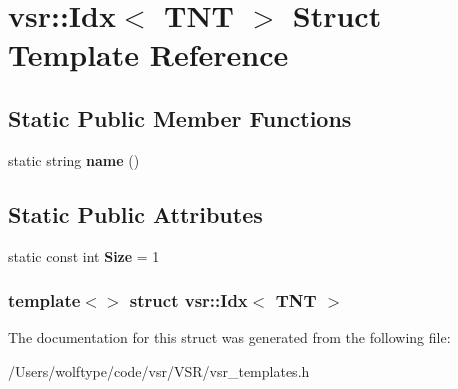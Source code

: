 \hypertarget{structvsr_1_1_idx_3_01_t_n_t_01_4}{\section{vsr\-:\-:Idx$<$ T\-N\-T $>$ Struct Template Reference}
\label{structvsr_1_1_idx_3_01_t_n_t_01_4}
}
\subsection*{Static Public Member Functions}
\begin{DoxyCompactItemize}
\item 
\hypertarget{structvsr_1_1_idx_3_01_t_n_t_01_4_a67dd3defb9401201fbe3f3e56bdcdd74}{static string {\bfseries name} ()}\label{structvsr_1_1_idx_3_01_t_n_t_01_4_a67dd3defb9401201fbe3f3e56bdcdd74}

\end{DoxyCompactItemize}
\subsection*{Static Public Attributes}
\begin{DoxyCompactItemize}
\item 
\hypertarget{structvsr_1_1_idx_3_01_t_n_t_01_4_a94d5560a207e9739cc4d9ddc6c7772cb}{static const int {\bfseries Size} = 1}\label{structvsr_1_1_idx_3_01_t_n_t_01_4_a94d5560a207e9739cc4d9ddc6c7772cb}

\end{DoxyCompactItemize}
\subsubsection*{template$<$$>$ struct vsr\-::\-Idx$<$ T\-N\-T $>$}



The documentation for this struct was generated from the following file\-:\begin{DoxyCompactItemize}
\item 
/\-Users/wolftype/code/vsr/\-V\-S\-R/vsr\-\_\-templates.\-h\end{DoxyCompactItemize}
